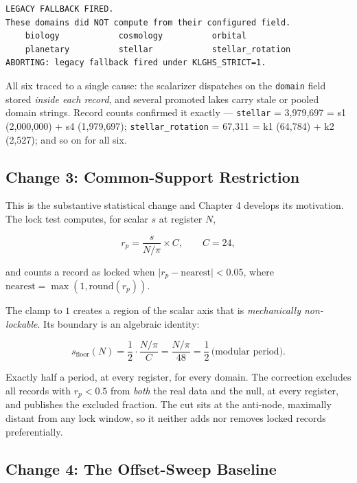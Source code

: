 \documentclass[11pt, letterpaper, openany]{book}
\begin{document}
\begin{lstlisting}[caption={Dispatch attribution, run of 23 August 2026}]
LEGACY FALLBACK FIRED.
These domains did NOT compute from their configured field.
    biology            cosmology          orbital
    planetary          stellar            stellar_rotation
ABORTING: legacy fallback fired under KLGHS_STRICT=1.
\end{lstlisting}

All six traced to a single cause: the scalarizer dispatches on the \texttt{domain} field stored
\emph{inside each record}, and several promoted lakes carry stale or pooled domain strings.
Record counts confirmed it exactly --- \texttt{stellar} = 3{,}979{,}697 = s1 (2{,}000{,}000)
+ s4 (1{,}979{,}697); \texttt{stellar\_rotation} = 67{,}311 = k1 (64{,}784) + k2 (2{,}527);
and so on for all six.

\subsection{Change 3: Common-Support Restriction}

This is the substantive statistical change and Chapter 4 develops its motivation. The lock test
computes, for scalar $s$ at register $N$,

\begin{equation}
r_p = \frac{s}{N/\pi} \times C, \qquad C = 24,
\end{equation}

and counts a record as locked when $\lvert r_p - \text{nearest}\rvert < 0.05$, where
$\text{nearest} = \max(1, \text{round}(r_p))$.

The clamp to $1$ creates a region of the scalar axis that is \emph{mechanically non-lockable}.
Its boundary is an algebraic identity:

\begin{equation}
s_{\text{floor}}(N) = \frac{1}{2}\cdot\frac{N/\pi}{C} = \frac{N/\pi}{48}
= \frac{1}{2}\,\text{(modular period)} .
\label{eq:floor}
\end{equation}

\noindent Exactly half a period, at every register, for every domain. The correction excludes
all records with $r_p < 0.5$ from \emph{both} the real data and the null, at every register,
and publishes the excluded fraction. The cut sits at the anti-node, maximally distant from any
lock window, so it neither adds nor removes locked records preferentially.

\subsection{Change 4: The Offset-Sweep Baseline}
\end{document}
